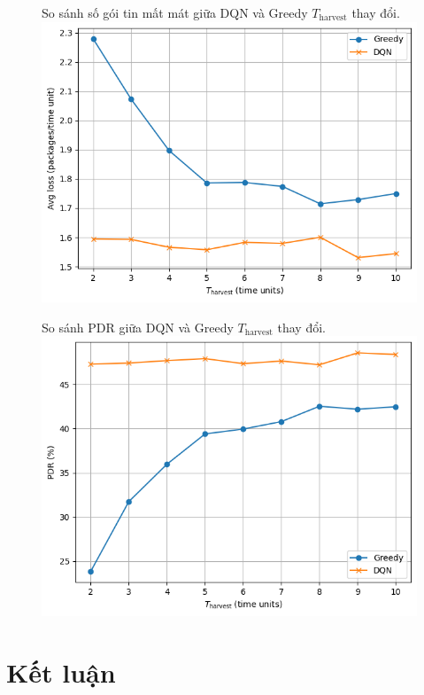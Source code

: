 \documentclass{uetgraduation}
\begin{document}
\begin{enumerate}
\begin{figure}{So sánh số gói tin mất mát giữa DQN và Greedy $T_\text{harvest}$ thay đổi.}
        \includegraphics[scale=0.5]{t_harvest_loss.png}
        \label{fig:t_loss}
    \end{figure}
    \begin{figure}{So sánh PDR giữa DQN và Greedy $T_\text{harvest}$ thay đổi.}
        \centering
        \includegraphics[scale=0.5]{t_harvest_pdr.png}
        \label{fig:t_pdr}
    \end{figure}


\end{enumerate}
\chapter{Kết luận}
\end{document}
